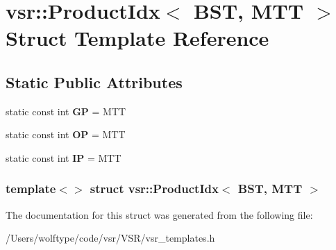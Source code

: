 \hypertarget{structvsr_1_1_product_idx_3_01_b_s_t_00_01_m_t_t_01_4}{\section{vsr\-:\-:Product\-Idx$<$ B\-S\-T, M\-T\-T $>$ Struct Template Reference}
\label{structvsr_1_1_product_idx_3_01_b_s_t_00_01_m_t_t_01_4}
}
\subsection*{Static Public Attributes}
\begin{DoxyCompactItemize}
\item 
\hypertarget{structvsr_1_1_product_idx_3_01_b_s_t_00_01_m_t_t_01_4_af63b35dd064225285042343e17726ec1}{static const int {\bfseries G\-P} = M\-T\-T}\label{structvsr_1_1_product_idx_3_01_b_s_t_00_01_m_t_t_01_4_af63b35dd064225285042343e17726ec1}

\item 
\hypertarget{structvsr_1_1_product_idx_3_01_b_s_t_00_01_m_t_t_01_4_aa3fc2b83fc8e53c6414542a51b2c453b}{static const int {\bfseries O\-P} = M\-T\-T}\label{structvsr_1_1_product_idx_3_01_b_s_t_00_01_m_t_t_01_4_aa3fc2b83fc8e53c6414542a51b2c453b}

\item 
\hypertarget{structvsr_1_1_product_idx_3_01_b_s_t_00_01_m_t_t_01_4_ad01ccfc4f7a8ee39dc2409e4a5393476}{static const int {\bfseries I\-P} = M\-T\-T}\label{structvsr_1_1_product_idx_3_01_b_s_t_00_01_m_t_t_01_4_ad01ccfc4f7a8ee39dc2409e4a5393476}

\end{DoxyCompactItemize}
\subsubsection*{template$<$$>$ struct vsr\-::\-Product\-Idx$<$ B\-S\-T, M\-T\-T $>$}



The documentation for this struct was generated from the following file\-:\begin{DoxyCompactItemize}
\item 
/\-Users/wolftype/code/vsr/\-V\-S\-R/vsr\-\_\-templates.\-h\end{DoxyCompactItemize}
